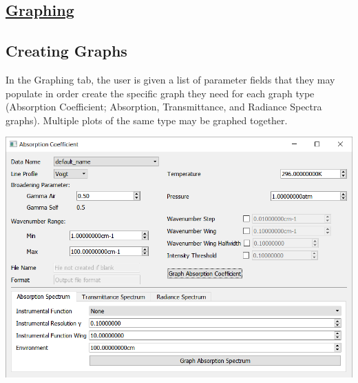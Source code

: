 \documentclass[a0,landscape]{a0poster}
\begin{document}
\begin{multicols}{3}
\section*{\underline{Graphing}}
\subsection*{Creating Graphs}
In the Graphing tab, the user is given a list of parameter fields that they may populate in order create the specific graph they need for each graph type (Absorption Coefficient; Absorption, Transmittance, and Radiance Spectra graphs). Multiple plots of the same type may be graphed together.
\begin{center}
\includegraphics[scale = 1.5]{GraphingWindow.png}
\end{center}
\vfill\null
\columnbreak


\end{multicols}
\end{document}
